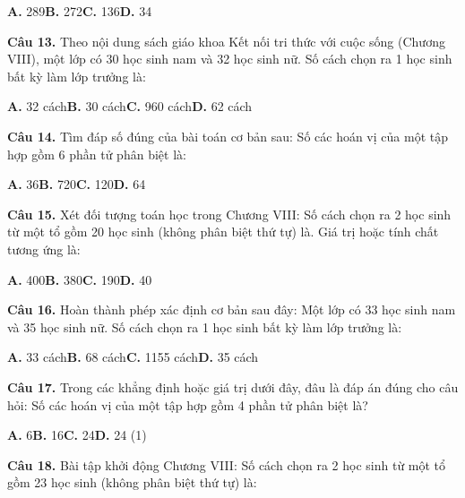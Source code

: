 \documentclass[11pt,a4paper]{article}
\begin{document}
\hspace*{1.5em}\textbf{A.} 289\quad\quad \textbf{B.} 272\quad\quad \textbf{C.} 136\quad\quad \textbf{D.} 34\par\vspace{2pt}
\textbf{\color{primary} Câu 13.} Theo nội dung sách giáo khoa Kết nối tri thức với cuộc sống (Chương VIII), một lớp có 30 học sinh nam và 32 học sinh nữ. Số cách chọn ra 1 học sinh bất kỳ làm lớp trưởng là:\par
\hspace*{1.5em}\textbf{A.} 32 cách\quad\quad \textbf{B.} 30 cách\quad\quad \textbf{C.} 960 cách\quad\quad \textbf{D.} 62 cách\par\vspace{2pt}
\textbf{\color{primary} Câu 14.} Tìm đáp số đúng của bài toán cơ bản sau: Số các hoán vị của một tập hợp gồm 6 phần tử phân biệt là:\par
\hspace*{1.5em}\textbf{A.} 36\quad\quad \textbf{B.} 720\quad\quad \textbf{C.} 120\quad\quad \textbf{D.} 64\par\vspace{2pt}
\textbf{\color{primary} Câu 15.} Xét đối tượng toán học trong Chương VIII: Số cách chọn ra 2 học sinh từ một tổ gồm 20 học sinh (không phân biệt thứ tự) là. Giá trị hoặc tính chất tương ứng là:\par
\hspace*{1.5em}\textbf{A.} 400\quad\quad \textbf{B.} 380\quad\quad \textbf{C.} 190\quad\quad \textbf{D.} 40\par\vspace{2pt}
\textbf{\color{primary} Câu 16.} Hoàn thành phép xác định cơ bản sau đây: Một lớp có 33 học sinh nam và 35 học sinh nữ. Số cách chọn ra 1 học sinh bất kỳ làm lớp trưởng là:\par
\hspace*{1.5em}\textbf{A.} 33 cách\quad\quad \textbf{B.} 68 cách\quad\quad \textbf{C.} 1155 cách\quad\quad \textbf{D.} 35 cách\par\vspace{2pt}
\textbf{\color{primary} Câu 17.} Trong các khẳng định hoặc giá trị dưới đây, đâu là đáp án đúng cho câu hỏi: Số các hoán vị của một tập hợp gồm 4 phần tử phân biệt là?\par
\hspace*{1.5em}\textbf{A.} 6\quad\quad \textbf{B.} 16\quad\quad \textbf{C.} 24\quad\quad \textbf{D.} 24 (1)\par\vspace{2pt}
\textbf{\color{primary} Câu 18.} Bài tập khởi động Chương VIII: Số cách chọn ra 2 học sinh từ một tổ gồm 23 học sinh (không phân biệt thứ tự) là:\par
\end{document}
